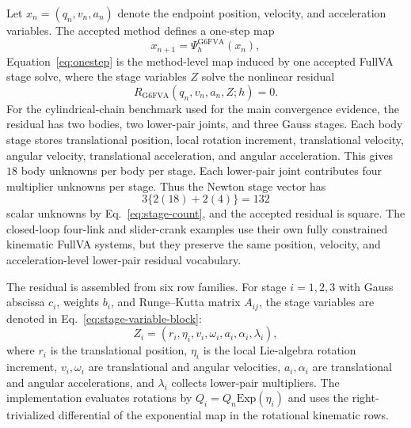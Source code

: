 \documentclass[preprint,12pt]{elsarticle}
\begin{document}
Let $x_n=(q_n,v_n,a_n)$ denote the endpoint position, velocity, and
acceleration variables. The accepted method defines a one-step map
\begin{equation}
  x_{n+1}=\Psi_h^{\mathrm{G6FVA}}(x_n),
  \label{eq:onestep}
\end{equation}
Equation~\eqref{eq:onestep} is the method-level map induced by one accepted
FullVA stage solve, where the stage variables $Z$ solve the nonlinear residual
\begin{equation}
  R_{\mathrm{G6FVA}}(q_n,v_n,a_n,Z;h)=0 .
  \label{eq:residual}
\end{equation}
For the cylindrical-chain benchmark used for the main convergence evidence,
the residual has two bodies, two lower-pair joints, and three Gauss stages.
Each body stage stores translational position, local rotation increment,
translational velocity, angular velocity, translational acceleration, and
angular acceleration. This gives $18$ body unknowns per body per stage. Each
lower-pair joint contributes four multiplier unknowns per stage. Thus the
Newton stage vector has
\begin{equation}
  3\{2(18)+2(4)\}=132
  \label{eq:stage-count}
\end{equation}
scalar unknowns by Eq.~\eqref{eq:stage-count}, and the accepted residual is
square. The closed-loop
four-link and slider-crank examples use their own fully constrained
kinematic FullVA systems, but they preserve the same position, velocity, and
acceleration-level lower-pair residual vocabulary.

The residual is assembled from six row families. For stage $i=1,2,3$ with
Gauss abscissa $c_i$, weights $b_i$, and Runge--Kutta matrix $A_{ij}$, the
stage variables are denoted in Eq.~\eqref{eq:stage-variable-block}:
\begin{equation}
\label{eq:stage-variable-block}
  Z_i=(r_i,\eta_i,v_i,\omega_i,a_i,\alpha_i,\lambda_i),
\end{equation}
where $r_i$ is the translational position, $\eta_i$ is the local Lie-algebra
rotation increment, $v_i,\omega_i$ are translational and angular velocities,
$a_i,\alpha_i$ are translational and angular accelerations, and $\lambda_i$
collects lower-pair multipliers. The implementation evaluates rotations by
$Q_i=Q_n\mathrm{Exp}(\eta_i)$ and uses the right-trivialized differential of
the exponential map in the rotational kinematic rows.
\end{document}
